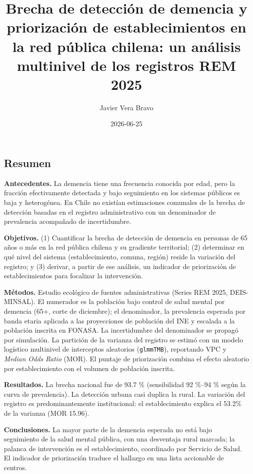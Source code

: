 \documentclass[
  spanish,
  letterpaper,
  DIV=11,
  numbers=noendperiod]{scrartcl}
\title{Brecha de detección de demencia y priorización de
establecimientos en la red pública chilena: un análisis multinivel de
los registros REM 2025}
\author{Javier Vera Bravo}
\date{2026-06-25}
\renewcommand*\contentsname{Tabla de contenidos}
\newcommand\contentsname{Tabla de contenidos}
\begin{document}
\maketitle

\renewcommand*\contentsname{Tabla de contenidos}
{
\setcounter{tocdepth}{3}
\tableofcontents
}

\subsection*{Resumen}\label{resumen}

\textbf{Antecedentes.} La demencia tiene una frecuencia conocida por
edad, pero la fracción efectivamente detectada y bajo seguimiento en los
sistemas públicos es baja y heterogénea. En Chile no existían
estimaciones comunales de la brecha de detección basadas en el registro
administrativo con un denominador de prevalencia acompañado de
incertidumbre.

\textbf{Objetivos.} (1) Cuantificar la brecha de detección de demencia
en personas de 65 años o más en la red pública chilena y su gradiente
territorial; (2) determinar en qué nivel del sistema (establecimiento,
comuna, región) reside la variación del registro; y (3) derivar, a
partir de ese análisis, un indicador de priorización de establecimientos
para focalizar la intervención.

\textbf{Métodos.} Estudio ecológico de fuentes administrativas (Series
REM 2025, DEIS-MINSAL). El numerador es la población bajo control de
salud mental por demencia (65+, corte de diciembre); el denominador, la
prevalencia esperada por banda etaria aplicada a las proyecciones de
población del INE y escalada a la población inscrita en FONASA. La
incertidumbre del denominador se propagó por simulación. La partición de
la varianza del registro se estimó con un modelo logístico multinivel de
interceptos aleatorios (\texttt{glmmTMB}), reportando VPC y \emph{Median
Odds Ratio} (MOR). El puntaje de priorización combina el efecto
aleatorio por establecimiento con el volumen de población inscrita.

\textbf{Resultados.} La brecha nacional fue de 93.7 \% (sensibilidad 92
\%--94 \% según la curva de prevalencia). La detección urbana casi
duplica la rural. La variación del registro es predominantemente
institucional: el establecimiento explica el 53.2\% de la varianza (MOR
15.96).

\textbf{Conclusiones.} La mayor parte de la demencia esperada no está
bajo seguimiento de la salud mental pública, con una desventaja rural
marcada; la palanca de intervención es el establecimiento, coordinado
por Servicio de Salud. El indicador de priorización traduce el hallazgo
en una lista accionable de centros.
\end{document}
